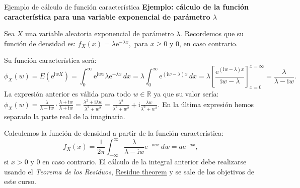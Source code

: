 \documentclass[
  ignorenonframetext,
  aspectratio=169]{beamer}
\begin{document}
\begin{frame}{Ejemplo de cálculo de función característica}
\protect\hypertarget{ejemplo-de-cuxe1lculo-de-funciuxf3n-caracteruxedstica-1}{}
\textbf{Ejemplo: cálculo de la función característica para una variable
exponencial de parámetro \(\lambda\)}

Sea \(X\) una variable aleatoria exponencial de parámetro \(\lambda\).
Recordemos que su función de densidad es:
\(f_X(x)=\lambda \mathrm{e}^{-\lambda x},\) para \(x\geq 0\) y \(0\), en
caso contrario.

Su función característica será: \[
\phi_X (w)=E\left(\mathrm{e}^{\mathrm{i}wX}\right)=\int_0^\infty \mathrm{e}^{\mathrm{i}w x}\lambda \mathrm{e}^{-\lambda x}\, dx = \lambda \int_0^\infty\mathrm{e}^{(\mathrm{i}w-\lambda)x}\, dx = \lambda\left[\frac{\mathrm{e}^{(\mathrm{i}w-\lambda)x}}{\mathrm{i}w-\lambda}\right]_{x=0}^{x=\infty} = \frac{\lambda}{\lambda -\mathrm{i} w}. 
\] La expresión anterior es válida para todo \(w\in\mathbb{R}\) ya que
su valor sería:
\(\phi_X (w)=\frac{\lambda}{\lambda -\mathrm{i} w}\cdot \frac{\lambda +\mathrm{i} w}{\lambda +\mathrm{i} w}=\frac{\lambda^2+\mathrm{i}\lambda w}{\lambda^2+w^2}=\frac{\lambda^2}{\lambda^2+w^2}+\mathrm{i}\frac{\lambda w}{\lambda^2+w^2}.\)
En la última expresión hemos separado la parte real de la imaginaria.

Calculemos la función de densidad a partir de la función característica:
\[
f_X(x)=\frac{1}{2\pi}\int_{-\infty}^\infty \frac{\lambda}{\lambda -\mathrm{i} w}\mathrm{e}^{-\mathrm{i}wx}\, dw = a\mathrm{e}^{-a x},
\] si \(x>0\) y \(0\) en caso contrario. El cálculo de la integral
anterior debe realizarse usando el \emph{Teorema de los Residuos},
\href{https://en.wikipedia.org/wiki/Residue_theorem}{Residue theorem} y
se sale de los objetivos de este curso.
\end{frame}
\end{document}
